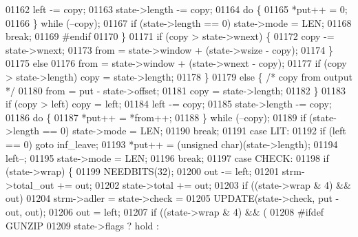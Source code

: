\begin{DoxyCode}
{{{{{{{{{{{{01162                     left -= copy;
01163                     state->length -= copy;
01164                     \textcolor{keywordflow}{do} \{
01165                         *put++ = 0;
01166                     \} \textcolor{keywordflow}{while} (--copy);
01167                     \textcolor{keywordflow}{if} (state->length == 0) state->mode = LEN;
01168                     \textcolor{keywordflow}{break};
01169 \textcolor{preprocessor}{#endif}
01170                 \}
01171                 \textcolor{keywordflow}{if} (copy > state->wnext) \{
01172                     copy -= state->wnext;
01173                     from = state->window + (state->wsize - copy);
01174                 \}
01175                 \textcolor{keywordflow}{else}
01176                     from = state->window + (state->wnext - copy);
01177                 \textcolor{keywordflow}{if} (copy > state->length) copy = state->length;
01178             \}
01179             \textcolor{keywordflow}{else} \{                              \textcolor{comment}{/* copy from output */}
01180                 from = put - state->offset;
01181                 copy = state->length;
01182             \}
01183             \textcolor{keywordflow}{if} (copy > left) copy = left;
01184             left -= copy;
01185             state->length -= copy;
01186             \textcolor{keywordflow}{do} \{
01187                 *put++ = *from++;
01188             \} \textcolor{keywordflow}{while} (--copy);
01189             \textcolor{keywordflow}{if} (state->length == 0) state->mode = LEN;
01190             \textcolor{keywordflow}{break};
01191         \textcolor{keywordflow}{case} LIT:
01192             \textcolor{keywordflow}{if} (left == 0) \textcolor{keywordflow}{goto} inf\_leave;
01193             *put++ = (\textcolor{keywordtype}{unsigned} char)(state->length);
01194             left--;
01195             state->mode = LEN;
01196             \textcolor{keywordflow}{break};
01197         \textcolor{keywordflow}{case} CHECK:
01198             \textcolor{keywordflow}{if} (state->wrap) \{
01199                 NEEDBITS(32);
01200                 out -= left;
01201                 strm->total\_out += out;
01202                 state->total += out;
01203                 \textcolor{keywordflow}{if} ((state->wrap & 4) && out)
01204                     strm->adler = state->check =
01205                         UPDATE(state->check, put - out, out);
01206                 out = left;
01207                 \textcolor{keywordflow}{if} ((state->wrap & 4) && (
01208 #ifdef GUNZIP
01209                      state->flags ? hold :
}}}}}}}}}}}}
\end{DoxyCode}
